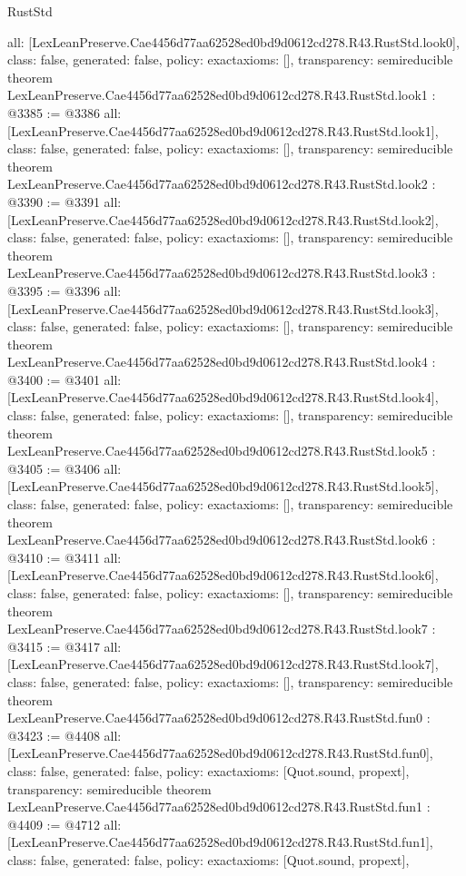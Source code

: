 \begin{lexlean}{RustStd}
\begin{coremodule}
{  all: [LexLeanPreserve.Cae4456d77aa62528ed0bd9d0612cd278.R43.RustStd.look0],
  class: false,
  generated: false,
  policy: exact{axioms: []},
  transparency: semireducible
}
theorem LexLeanPreserve.Cae4456d77aa62528ed0bd9d0612cd278.R43.RustStd.look1 : @3385 := @3386 {
  all: [LexLeanPreserve.Cae4456d77aa62528ed0bd9d0612cd278.R43.RustStd.look1],
  class: false,
  generated: false,
  policy: exact{axioms: []},
  transparency: semireducible
}
theorem LexLeanPreserve.Cae4456d77aa62528ed0bd9d0612cd278.R43.RustStd.look2 : @3390 := @3391 {
  all: [LexLeanPreserve.Cae4456d77aa62528ed0bd9d0612cd278.R43.RustStd.look2],
  class: false,
  generated: false,
  policy: exact{axioms: []},
  transparency: semireducible
}
theorem LexLeanPreserve.Cae4456d77aa62528ed0bd9d0612cd278.R43.RustStd.look3 : @3395 := @3396 {
  all: [LexLeanPreserve.Cae4456d77aa62528ed0bd9d0612cd278.R43.RustStd.look3],
  class: false,
  generated: false,
  policy: exact{axioms: []},
  transparency: semireducible
}
theorem LexLeanPreserve.Cae4456d77aa62528ed0bd9d0612cd278.R43.RustStd.look4 : @3400 := @3401 {
  all: [LexLeanPreserve.Cae4456d77aa62528ed0bd9d0612cd278.R43.RustStd.look4],
  class: false,
  generated: false,
  policy: exact{axioms: []},
  transparency: semireducible
}
theorem LexLeanPreserve.Cae4456d77aa62528ed0bd9d0612cd278.R43.RustStd.look5 : @3405 := @3406 {
  all: [LexLeanPreserve.Cae4456d77aa62528ed0bd9d0612cd278.R43.RustStd.look5],
  class: false,
  generated: false,
  policy: exact{axioms: []},
  transparency: semireducible
}
theorem LexLeanPreserve.Cae4456d77aa62528ed0bd9d0612cd278.R43.RustStd.look6 : @3410 := @3411 {
  all: [LexLeanPreserve.Cae4456d77aa62528ed0bd9d0612cd278.R43.RustStd.look6],
  class: false,
  generated: false,
  policy: exact{axioms: []},
  transparency: semireducible
}
theorem LexLeanPreserve.Cae4456d77aa62528ed0bd9d0612cd278.R43.RustStd.look7 : @3415 := @3417 {
  all: [LexLeanPreserve.Cae4456d77aa62528ed0bd9d0612cd278.R43.RustStd.look7],
  class: false,
  generated: false,
  policy: exact{axioms: []},
  transparency: semireducible
}
theorem LexLeanPreserve.Cae4456d77aa62528ed0bd9d0612cd278.R43.RustStd.fun0 : @3423 := @4408 {
  all: [LexLeanPreserve.Cae4456d77aa62528ed0bd9d0612cd278.R43.RustStd.fun0],
  class: false,
  generated: false,
  policy: exact{axioms: [Quot.sound, propext]},
  transparency: semireducible
}
theorem LexLeanPreserve.Cae4456d77aa62528ed0bd9d0612cd278.R43.RustStd.fun1 : @4409 := @4712 {
  all: [LexLeanPreserve.Cae4456d77aa62528ed0bd9d0612cd278.R43.RustStd.fun1],
  class: false,
  generated: false,
  policy: exact{axioms: [Quot.sound, propext]},
}
\end{coremodule}
\end{lexlean}
